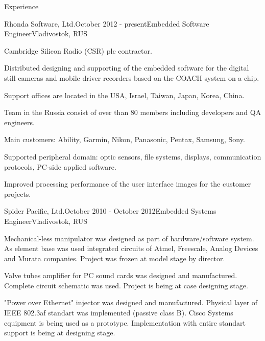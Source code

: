 \documentclass{resume}
\begin{document}
\begin{rSection}{Experience}

\begin{rSubsection}{Rhonda Software, Ltd.}{October 2012 - present}{Embedded Software Engineer}{Vladivostok, RUS}
\item Cambridge Silicon Radio (CSR) plc contractor.
\item Distributed designing and supporting of the embedded software for the digital still cameras and mobile driver recorders based on the COACH system on a chip.
\item Support offices are located in the USA, Israel, Taiwan, Japan, Korea, China.
\item Team in the Russia consist of over than 80 members including developers and QA engineers.
\item Main customers: Ability, Garmin, Nikon, Panasonic, Pentax, Samsung, Sony.
\item Supported peripheral domain: optic sensors, file systems, displays, communication protocols, PC-side applied software.
\item Improved processing performance of the user interface images for the customer projects.
\end{rSubsection}

\begin{rSubsection}{Spider Pacific, Ltd.}{October 2010 - October 2012}{Embedded Systems Engineer}{Vladivostok, RUS}
\item Mechanical-less manipulator was designed as part of hardware/software system. As element base was used 
integrated circuits of Atmel, Freescale, Analog Devices and Murata companies. Project was frozen at model stage by director.
\item Valve tubes amplifier for PC sound cards was designed and manufactured. Complete circuit schematic was 
used. Project is being at case designing stage.
\item "Power over Ethernet" injector was designed and manufactured. Physical layer of IEEE 802.3af standart was 
implemented (passive class B). Cisco Systems equipment is being used as a prototype. Implementation with entire 
standart support is being at designing stage.
\end{rSubsection}

\end{rSection}

\end{document}
